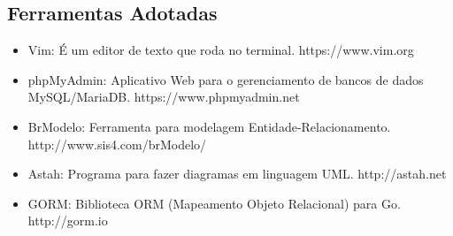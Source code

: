 \documentclass[12pt]{article}
\begin{document}
\subsection{Ferramentas Adotadas}

\begin{itemize}
	\item Vim: É um editor de texto que roda no terminal. https://www.vim.org
	\item phpMyAdmin: Aplicativo Web para o gerenciamento de bancos de dados MySQL/MariaDB. https://www.phpmyadmin.net
	\item BrModelo: Ferramenta para modelagem Entidade-Relacionamento. http://www.sis4.com/brModelo/
	\item Astah: Programa para fazer diagramas em linguagem UML. http://astah.net
	\item GORM: Biblioteca ORM (Mapeamento Objeto Relacional) para Go. http://gorm.io
\end{itemize}

\newpage
\end{document}
